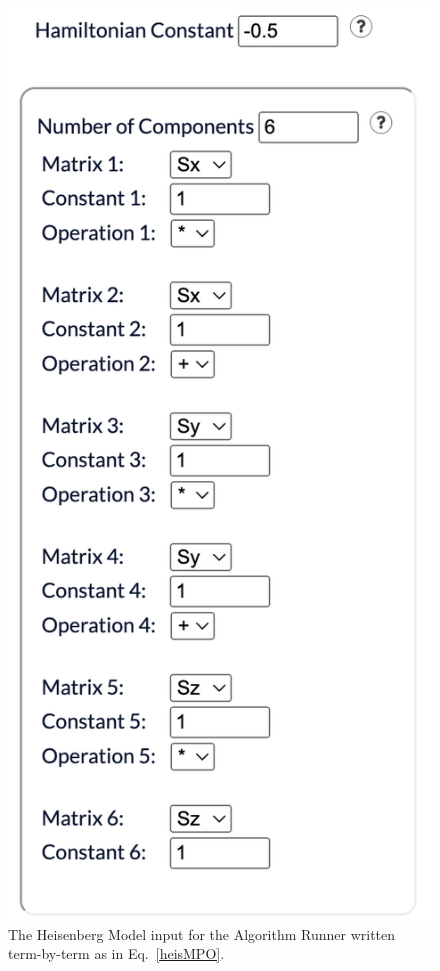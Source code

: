\documentclass{juliacon}
\begin{document}
\begin{figure}
\begin{center}
    \includegraphics[scale=0.5]{HeisenbergModel.png}
\end{center}
    \caption{The Heisenberg Model input for the Algorithm Runner written term-by-term as in Eq.~\eqref{heisMPO}.
    \label{heismodel}
    }
\end{figure}
\end{document}
